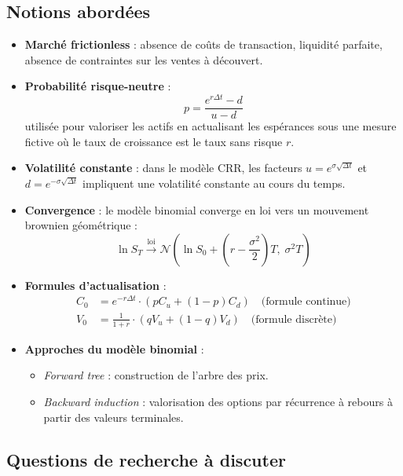 \documentclass[a4paper,11pt]{article}
\begin{document}
\subsection{Notions abordées}

\begin{itemize}
    \item \textbf{Marché frictionless} : absence de coûts de transaction, liquidité parfaite, absence de contraintes sur les ventes à découvert.
    
    \item \textbf{Probabilité risque-neutre} :
    \[
        p = \frac{e^{r \Delta t} - d}{u - d}
    \]
    utilisée pour valoriser les actifs en actualisant les espérances sous une mesure fictive où le taux de croissance est le taux sans risque \(r\).

    \item \textbf{Volatilité constante} : dans le modèle CRR, les facteurs \(u = e^{\sigma \sqrt{\Delta t}}\) et \(d = e^{-\sigma \sqrt{\Delta t}}\) impliquent une volatilité constante au cours du temps.

    \item \textbf{Convergence} : le modèle binomial converge en loi vers un mouvement brownien géométrique :
    \[
        \ln S_T \xrightarrow{\text{loi}} \mathcal{N} \left( \ln S_0 + \left(r - \frac{\sigma^2}{2}\right)T,\; \sigma^2 T \right)
    \]

    \item \textbf{Formules d’actualisation} :
    \begin{align*}
        C_0 &= e^{-r \Delta t} \cdot \left( p C_u + (1 - p) C_d \right) \quad \text{(formule continue)} \\
        V_0 &= \frac{1}{1 + r} \cdot \left( q V_u + (1 - q) V_d \right) \quad \text{(formule discrète)}
    \end{align*}

    \item \textbf{Approches du modèle binomial} :
    \begin{itemize}
        \item \textit{Forward tree} : construction de l’arbre des prix.
        \item \textit{Backward induction} : valorisation des options par récurrence à rebours à partir des valeurs terminales.
    \end{itemize}
\end{itemize}

\subsection{Questions de recherche à discuter}
\end{document}
